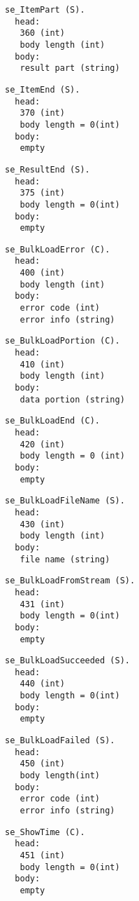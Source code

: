 \documentclass[a4paper,12pt]{article}
\begin{document}
\begin{verbatim}
se_ItemPart (S).
  head:
   360 (int)
   body length (int)
  body:
   result part (string)
\end{verbatim}

\begin{verbatim}
se_ItemEnd (S).
  head:
   370 (int)
   body length = 0(int)
  body:
   empty
\end{verbatim}

\begin{verbatim}
se_ResultEnd (S).
  head:
   375 (int)
   body length = 0(int)
  body:
   empty
\end{verbatim}

\begin{verbatim}
se_BulkLoadError (C).
  head:
   400 (int)
   body length (int)
  body:
   error code (int)
   error info (string)
\end{verbatim}

\begin{verbatim}
se_BulkLoadPortion (C).
  head:
   410 (int)
   body length (int)
  body:
   data portion (string)
\end{verbatim}

\begin{verbatim}
se_BulkLoadEnd (C).
  head:
   420 (int)
   body length = 0 (int)
  body:
   empty
\end{verbatim}

\begin{verbatim}
se_BulkLoadFileName (S).
  head:
   430 (int)
   body length (int)
  body:
   file name (string)
\end{verbatim}

\begin{verbatim}
se_BulkLoadFromStream (S).
  head:
   431 (int)
   body length = 0(int)
  body:
   empty
\end{verbatim}

\begin{verbatim}
se_BulkLoadSucceeded (S).
  head:
   440 (int)
   body length = 0(int)
  body:
   empty
\end{verbatim}

\begin{verbatim}
se_BulkLoadFailed (S).
  head:
   450 (int)
   body length(int)
  body:
   error code (int)
   error info (string)
\end{verbatim}

\begin{verbatim}
se_ShowTime (C).
  head:
   451 (int)
   body length = 0(int)
  body:
   empty
\end{verbatim}
\end{document}
